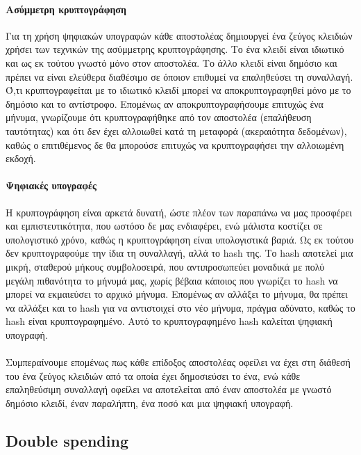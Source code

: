 \documentclass[titlepage]{article}
\begin{document}
\paragraph{Ασύμμετρη κρυπτογράφηση}

Για τη χρήση ψηφιακών υπογραφών κάθε αποστολέας δημιουργεί ένα ζεύγος κλειδιών χρήσει των τεχνικών της ασύμμετρης κρυπτογράφησης. Το ένα κλειδί είναι ιδιωτικό και ως εκ τούτου γνωστό μόνο στον αποστολέα. Το άλλο κλειδί είναι δημόσιο και πρέπει να είναι ελεύθερα διαθέσιμο σε όποιον επιθυμεί να επαληθεύσει τη συναλλαγή. Ό,τι κρυπτογραφείται με το ιδιωτικό κλειδί μπορεί να αποκρυπτογραφηθεί μόνο με το δημόσιο και το αντίστροφο. Επομένως αν αποκρυπτογραφήσουμε επιτυχώς ένα μήνυμα, γνωρίζουμε ότι κρυπτογραφήθηκε από τον αποστολέα (επαλήθευση ταυτότητας) και ότι δεν έχει αλλοιωθεί κατά τη μεταφορά (ακεραιότητα δεδομένων), καθώς ο επιτιθέμενος δε θα μπορούσε επιτυχώς να κρυπτογραφήσει την αλλοιωμένη εκδοχή.

\paragraph{Ψηφιακές υπογραφές}

Η κρυπτογράφηση είναι αρκετά δυνατή, ώστε πλέον των παραπάνω να μας προσφέρει και εμπιστευτικότητα, που ωστόσο δε μας ενδιαφέρει, ενώ μάλιστα κοστίζει σε υπολογιστικό χρόνο, καθώς η κρυπτογράφηση είναι υπολογιστικά βαριά. Ως εκ τούτου δεν κρυπτογραφούμε την ίδια τη συναλλαγή, αλλά το hash της. Το hash αποτελεί μια μικρή, σταθερού μήκους συμβολοσειρά, που αντιπροσωπεύει μοναδικά με πολύ μεγάλη πιθανότητα το μήνυμά μας, χωρίς βέβαια κάποιος που γνωρίζει το hash να μπορεί να εκμαιεύσει το αρχικό μήνυμα. Επομένως αν αλλάξει το μήνυμα, θα πρέπει να αλλάξει και το hash για να αντιστοιχεί στο νέο μήνυμα, πράγμα αδύνατο, καθώς το hash είναι κρυπτογραφημένο. Αυτό το κρυπτογραφημένο hash καλείται ψηφιακή υπογραφή.

\paragraph{}

Συμπεραίνουμε επομένως πως κάθε επίδοξος αποστολέας οφείλει να έχει στη διάθεσή του ένα ζεύγος κλειδιών από τα οποία έχει δημοσιεύσει το ένα, ενώ κάθε επαληθεύσιμη συναλλαγή οφείλει να αποτελείται από έναν αποστολέα με γνωστό δημόσιο κλειδί, έναν παραλήπτη, ένα ποσό και μια ψηφιακή υπογραφή.

\subsection{Double spending}
\end{document}

